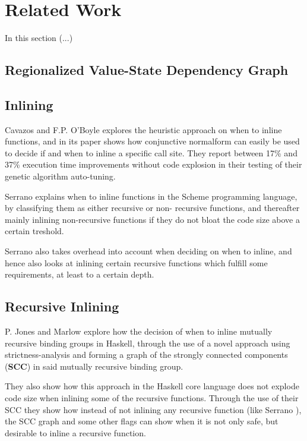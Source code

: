 
\section{Related Work}

In this section (...)

\subsection{Regionalized Value-State Dependency Graph}

\subsection{Inlining}

Cavazos and F.P. O'Boyle \cite{AutoTuningJavaHeuristics} explores the heuristic
approach on when to inline functions, and in its paper shows how conjunctive
normalform can easily be used to decide if and when to inline a specific call
site. They report between 17\% and 37\% execution time improvements without
code explosion in their testing of their genetic algorithm auto-tuning.

Serrano \cite{InlineWhenHowSerrano} explains when to inline functions in the
Scheme programming language, by classifying them as either recursive or  non-
recursive functions, and thereafter mainly inlining non-recursive functions if
they do not bloat the code size above a certain treshold.

Serrano \cite{InlineWhenHowSerrano} also takes overhead into account when
deciding on when to inline, and hence also looks at inlining certain recursive
functions which fulfill some requirements, at least to a certain depth.

\subsection{Recursive Inlining}

P. Jones and Marlow \cite{GHC-paper} explore how the decision of when to inline
mutually recursive binding groups in Haskell, through the use of a novel
approach using strictness-analysis and forming a graph of the strongly connected
components (\textbf{SCC}) in said mutually recursive binding group.

They also show how this approach in the Haskell core language does not explode
code size when inlining some of the recursive functions. Through the use of
their SCC they show how instead of not inlining any recursive function (like
Serrano \cite{InlineWhenHowSerrano}), the SCC graph and some other flags can
show when it is not only safe, but desirable to inline a recursive function.
